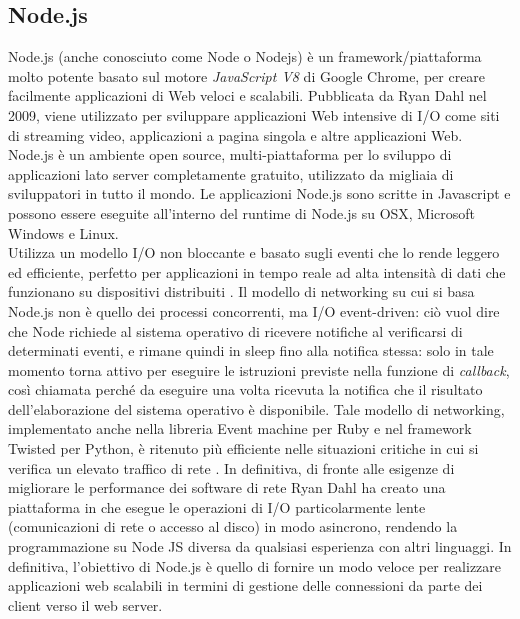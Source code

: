 \subsection{Node.js}
\label{sec:nodejs}
Node.js (anche conosciuto come Node o Nodejs) è un framework/piattaforma molto potente basato sul motore \textit{JavaScript V8} di Google Chrome, per creare facilmente applicazioni di Web veloci e scalabili. Pubblicata da Ryan Dahl nel 2009, viene utilizzato per sviluppare applicazioni Web intensive di I/O come siti di streaming video, applicazioni a pagina singola e altre applicazioni Web. Node.js è un ambiente open source, multi-piattaforma per lo sviluppo di applicazioni lato server completamente gratuito, utilizzato da migliaia di sviluppatori in tutto il mondo. Le applicazioni Node.js sono scritte in Javascript e possono essere eseguite all'interno del runtime di Node.js su OSX, Microsoft Windows e Linux. 
\\Utilizza un modello I/O non bloccante e basato sugli eventi che lo rende leggero ed efficiente, perfetto per applicazioni in tempo reale ad alta intensità di dati che funzionano su dispositivi distribuiti \cite{node:home}. Il modello di networking su cui si basa Node.js non è quello dei processi concorrenti, ma I/O event-driven: ciò vuol dire che Node richiede al sistema operativo di ricevere notifiche al verificarsi di determinati eventi, e rimane quindi in sleep fino alla notifica stessa: solo in tale momento torna attivo per eseguire le istruzioni previste nella funzione di \textit{callback}, così chiamata perché da eseguire una volta ricevuta la notifica che il risultato dell'elaborazione del sistema operativo è disponibile. Tale modello di networking, implementato anche nella libreria Event machine per Ruby e nel framework Twisted per Python, è ritenuto più efficiente nelle situazioni critiche in cui si verifica un elevato traffico di rete \cite{node:wiki}. In definitiva, di fronte alle esigenze di migliorare le performance dei software di rete Ryan Dahl ha creato una piattaforma in che esegue le operazioni di I/O particolarmente lente (comunicazioni di rete o accesso al disco) in modo asincrono, rendendo la programmazione su Node JS diversa da qualsiasi esperienza con altri linguaggi. In definitiva, l'obiettivo di Node.js è quello di fornire un modo veloce per realizzare applicazioni web scalabili in termini di gestione delle connessioni da parte dei client verso il web server.
